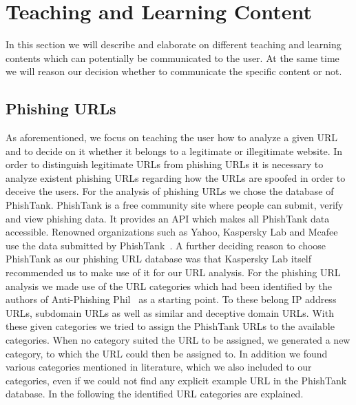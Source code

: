 \section{Teaching and Learning Content}
In this section we will describe and elaborate on different teaching and learning contents which can potentially be communicated to the user. At the same time we will reason our decision whether to communicate the specific content or not.
\subsection{Phishing URLs}
As aforementioned, we focus on teaching the user how to analyze a given URL and to decide on it whether it belongs to a legitimate or illegitimate website. In order to distinguish legitimate URLs from phishing URLs it is necessary to analyze existent phishing URLs regarding how the URLs are spoofed in order to deceive the users. For the analysis of phishing URLs we chose the database of PhishTank.
PhishTank is a free community site where people can submit, verify and view phishing data. It provides an API which makes all PhishTank data accessible. Renowned organizations such as Yahoo, Kaspersky Lab and Mcafee use the data submitted by PhishTank~\cite{phishtank}. A further deciding reason to choose PhishTank as our phishing URL database was that Kaspersky Lab itself recommended us to make use of it for our URL analysis. For the phishing URL analysis we made use of the URL categories which had been identified by the authors of Anti-Phishing Phil~\cite{sheng2007antiphishingphil} as a starting point. To these belong IP address URLs, subdomain URLs as well as similar and deceptive domain URLs. With these given categories we tried to assign the PhishTank URLs to the available categories. When no category suited the URL to be assigned, we generated a new category, to which the URL could then be assigned to. In addition we found various categories mentioned in literature, which we also included to our categories, even if we could not find any explicit example URL in the PhishTank database. In the following the identified URL categories are explained.

